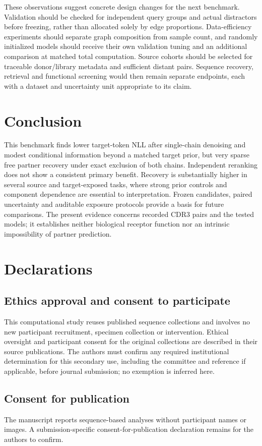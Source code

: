 \documentclass[10pt]{article}
\begin{document}
These observations suggest concrete design changes for the next benchmark.
Validation should be checked for independent query groups and actual distractors
before freezing, rather than allocated solely by edge proportions. Data-efficiency
experiments should separate graph composition from sample count, and randomly
initialized models should receive their own validation tuning and an additional
comparison at matched total computation. Source cohorts should be selected for
traceable donor/library metadata and sufficient distant pairs. Sequence recovery,
retrieval and functional screening would then remain separate endpoints, each
with a dataset and uncertainty unit appropriate to its claim.

\section{Conclusion}
This benchmark finds lower target-token NLL after single-chain denoising and
modest conditional information beyond a matched target prior, but very sparse
free partner recovery under exact exclusion of both chains. Independent
reranking does not show a consistent primary benefit. Recovery is substantially
higher in several source and target-exposed tasks, where strong prior controls
and component dependence are essential to interpretation. Frozen candidates,
paired uncertainty and auditable exposure protocols provide a basis for future
comparisons. The present evidence concerns recorded CDR3 pairs and the tested
models; it establishes neither biological receptor function nor an intrinsic
impossibility of partner prediction.

\section*{Declarations}
\subsection*{Ethics approval and consent to participate}
This computational study reuses published sequence collections and involves no
new participant recruitment, specimen collection or intervention. Ethical
oversight and participant consent for the original collections are described in
their source publications. The authors must confirm any required institutional
determination for this secondary use, including the committee and reference if
applicable, before journal submission; no exemption is inferred here.

\subsection*{Consent for publication}
The manuscript reports sequence-based analyses without participant names or
images. A submission-specific consent-for-publication declaration remains for
the authors to confirm.
\end{document}
